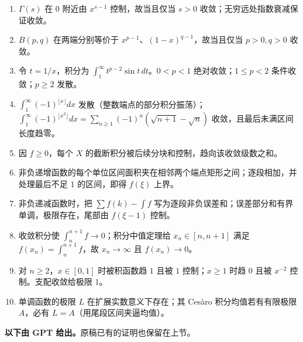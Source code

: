 \begin{enumerate}
\item $\Gamma(s)$ 在 $0$ 附近由 $x^{s-1}$ 控制，故当且仅当 $s>0$ 收敛；无穷远处指数衰减保证收敛。
\item $B(p,q)$ 在两端分别等价于 $x^{p-1}$、$(1-x)^{q-1}$，故当且仅当 $p>0,q>0$ 收敛。
\item 令 $t=1/x$，积分为 $\int_1^\infty t^{p-2}\sin t\,dt$。$0<p<1$ 绝对收敛；$1\le p<2$ 条件收敛；$p\ge2$ 发散。
\item $\int_1^\infty(-1)^{\lfloor x\rfloor}dx$ 发散（整数端点的部分积分振荡）；$\int_1^\infty(-1)^{\lfloor x^2\rfloor}dx=\sum_{n\ge1}(-1)^n(\sqrt{n+1}-\sqrt n)$ 收敛，且最后未满区间长度趋零。
\item 因 $f\ge0$，每个 $X$ 的截断积分被后续分块和控制，趋向该收敛级数之和。
\item 非负递增函数的每个单位区间面积夹在相邻两个端点矩形之间；逐段相加，并处理最后不足 $1$ 的区间，即得 $f(\xi)$ 上界。
\item 非负递减函数时，把 $\sum f(k)-\int f$ 写为逐段非负误差和；误差部分和有界单调，极限存在，尾部由 $f(\xi-1)$ 控制。
\item 收敛积分使 $\int_n^{n+1}f\to0$；积分中值定理给 $x_n\in[n,n+1]$ 满足 $f(x_n)=\int_n^{n+1}f$，故 $x_n\to\infty$ 且 $f(x_n)\to0$。
\item 对 $n\ge2$，$x\in[0,1]$ 时被积函数趋 $1$ 且被 $1$ 控制；$x\ge1$ 时趋 $0$ 且被 $x^{-2}$ 控制。支配收敛给极限 $1$。
\item 单调函数的极限 $L$ 在扩展实数意义下存在；其 Ces\`aro 积分均值若有有限极限 $A$，必有 $L=A$（用尾段区间夹逼均值）。
\end{enumerate}
\noindent\textbf{以下由 GPT 给出。}原稿已有的证明也保留在上节。
